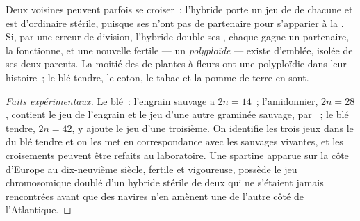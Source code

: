 \begin{proposition}\label{prop:g12:diversification-of-life:polyploidy}
Deux  voisines peuvent parfois se croiser~; l'hybride porte un
jeu de  de chacune et est d'ordinaire stérile, puisque ses
 n'ont pas de partenaire pour s'apparier à la . Si,
par une erreur de division, l'hybride double ses , chaque
 gagne un partenaire, la  fonctionne, et une nouvelle
 fertile --- un \emph{polyploïde} --- existe
d'emblée, isolée de ses deux parents. La moitié des  de plantes
à fleurs ont une polyploïdie dans leur histoire~; le blé tendre, le
coton, le tabac et la pomme de terre en sont.
\end{proposition}
\begin{proof}[Faits expérimentaux]
Le blé~: l'engrain sauvage a $2n = 14$~; l'amidonnier, $2n = 28$,
contient le jeu de l'engrain et le jeu d'une autre graminée sauvage,
 par ~; le blé tendre, $2n = 42$, y ajoute le jeu
d'une troisième. On identifie les trois jeux dans le  du blé
tendre et on les met en correspondance avec les  sauvages
vivantes, et les croisements peuvent être refaits au laboratoire. Une
spartine apparue sur la côte d'Europe au dix-neuvième siècle, fertile
et vigoureuse, possède le jeu chromosomique doublé d'un hybride stérile
de deux  qui ne s'étaient jamais rencontrées avant que des
navires n'en amènent une de l'autre côté de l'Atlantique.
\end{proof}

